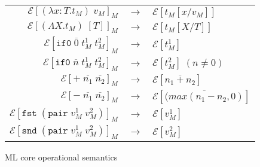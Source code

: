 \begin{figure}
\onehalfspacing
\begin{center}
\begin{tabular}{rcl}
$\mathscr{E}[(\lambda x:T.t_{M})\;v_{M}]_{M}$ & $\rightarrow$ & $\mathscr{E}[t_{M}[x/v_{M}]]$ \\
$\mathscr{E}[(\Lambda X.t_{M})\;[T]]_{M}$ & $\rightarrow$ & $\mathscr{E}[t_{M}[X/T]]$ \\
$\mathscr{E}[\mathtt{if0}\;\overline{0}\;t_{M}^{1}\;t_{M}^{2}]_{M}$ & $\rightarrow$ & $\mathscr{E}[t_{M}^{1}]$ \\
$\mathscr{E}[\mathtt{if0}\;\overline{n}\;t_{M}^{1}\;t_{M}^{2}]_{M}$ & $\rightarrow$ & $\mathscr{E}[t_{M}^{2}]\;(n\neq0)$ \\
$\mathscr{E}[+\;\overline{n_{1}}\;\overline{n_{2}}]_{M}$ & $\rightarrow$ & $\mathscr{E}[\overline{n_{1}+n_{2}}]$ \\
$\mathscr{E}[-\;\overline{n_{1}}\;\overline{n_{2}}]_{M}$ & $\rightarrow$ & $\mathscr{E}[\overline{(max(n_{1}-n_{2},0)}]$ \\
$\mathscr{E}[\mathtt{fst}\;(\mathtt{pair}\;v_{M}^{1}\;v_{M}^{2})]_{M}$ & $\rightarrow$ & $\mathscr{E}[v_{M}^{1}]$ \\
$\mathscr{E}[\mathtt{snd}\;(\mathtt{pair}\;v_{M}^{1}\;v_{M}^{2})]_{M}$ & $\rightarrow$ & $\mathscr{E}[v_{M}^{2}]$
\end{tabular}
\end{center}
\caption{ML core operational semantics}
\label{fig:mcos}
\end{figure}